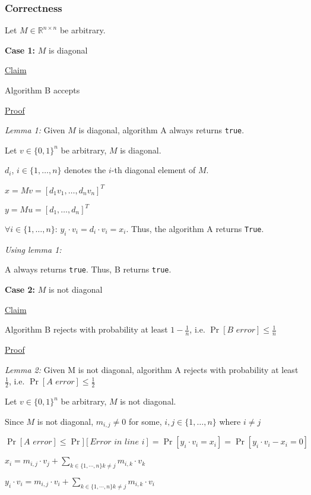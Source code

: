 \subsubsection*{Correctness}

Let $M  \in \mathbb{R}^{n \times n}$ be arbitrary.

\textbf{Case 1:} $M$ is diagonal

\underline{Claim} 

Algorithm B accepts

\underline{Proof}

\textit{Lemma 1:} Given $M$ is diagonal, algorithm A always returns \texttt{true}.

Let $v \in \{0,1\}^n$ be arbitrary, $M$ is diagonal.

$d_i$, $i \in \{1,\dots,n\}$ denotes the $i$-th diagonal element of $M$.

$x = Mv = [d_1 v_1,\dots, d_n v_n]^T$

$y = Mu = [d_1,\dots,d_n]^T$

$\forall i \in \{1,\dots,n\}$: $y_i \cdot v_i = d_i \cdot v_i = x_i$. Thus, the algorithm A returns \texttt{True}.

\textit{Using lemma 1:}

A always returns \texttt{true}. Thus, B returns \texttt{true}.

\textbf{Case 2:} $M$ is not diagonal

\underline{Claim} 

Algorithm B rejects with probability at least $1 - \frac{1}{n}$, i.e. $\operatorname{Pr}[\textit{B error}] \leq \frac{1}{n}$

\underline{Proof}

\textit{Lemma 2:} Given M is not diagonal, algorithm A rejects with probability at least $\frac{1}{2}$, i.e. $\operatorname{Pr}[\textit{A error}] \leq \frac{1}{2}$

Let $v \in \{0,1\}^n$ be arbitrary, $M$ is not diagonal.

Since $M$ is not diagonal, $m_{i,j} \neq 0$ for some, $i,j \in \{1,\dots,n\}$ where $i \neq j$

$\operatorname{Pr}[\textit{A error}] \leq
\operatorname{Pr}][\textit{Error in line i}] =
\operatorname{Pr}[y_i \cdot v_i = x_i] = 
\operatorname{Pr}[y_i \cdot v_i - x_i = 0]$

$x_i = m_{i,j} \cdot v_j + \sum_{k \in \{1,\cdots,n\} k \neq j} m_{i,k}\cdot v_k$

$y_i \cdot v_i = m_{i,j} \cdot v_i + \sum_{k \in \{1,\cdots,n\} k \neq j} m_{i,k}\cdot v_i$

